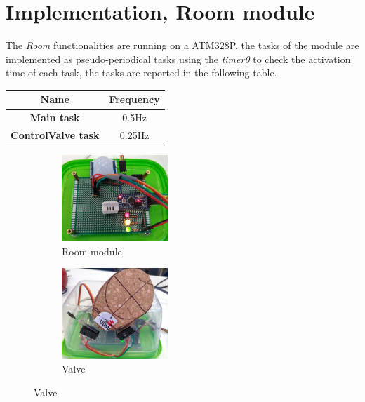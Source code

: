 \section{Implementation, Room module}
The \textit{Room} functionalities are running on a ATM328P, the tasks of the module are implemented as pseudo-periodical tasks using the \textit{timer0} 
to check the activation time of each task, the tasks are reported in the following table.

\begin{center}
	\begin{tabular}{||c | c ||} 
		\hline
		Name 	& Frequency \\ 
		\hline
		\textbf{Main task}			&	0.5Hz \\ 
		\hline
		\textbf{ControlValve task}	&	0.25Hz \\ 
		\hline
	\end{tabular}
\end{center}

\begin{figure}[h]
	\centering
	\begin{subfigure}{0.4\textwidth} %
		\includegraphics[width=4cm,keepaspectratio]{img/room_board}
		\caption{Room module}
		\label{fig:room_module}
		\end{subfigure}
	\vspace{1em} %
	\begin{subfigure}{0.4\textwidth} %
		\includegraphics[width=4cm,keepaspectratio]{img/valve}
		\caption{Valve}
		\label{fig:valve}
	\end{subfigure}
\end{figure}


